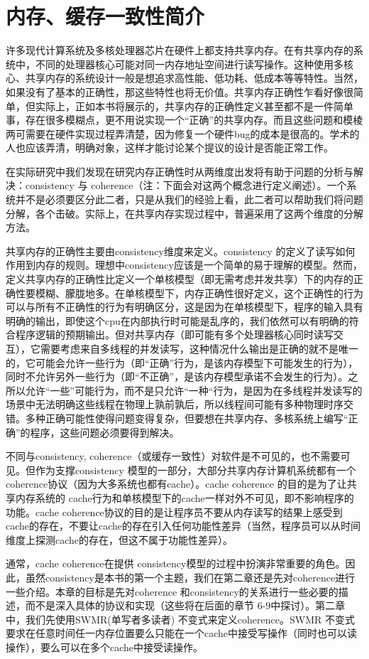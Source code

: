 \documentclass[UTF-8]{ctexbook}
\begin{document}
\chapter{内存、缓存一致性简介}
许多现代计算系统及多核处理器芯片在硬件上都支持共享内存。在有共享内存的系统中，不同的处理器核心可能对同一内存地址空间进行读写操作。这种使用多核心、共享内存的系统设计一般是想追求高性能、低功耗、低成本等等特性。当然，如果没有了基本的正确性，那这些特性也将无价值。共享内存正确性乍看好像很简单，但实际上，正如本书将展示的，共享内存的正确性定义甚至都不是一件简单事，存在很多模糊点，更不用说实现一个“正确”的共享内存。而且这些问题和模棱两可需要在硬件实现过程弄清楚，因为修复一个硬件bug的成本是很高的。学术的人也应该弄清，明确对象，这样才能讨论某个提议的设计是否能正常工作。
\par 在实际研究中我们发现在研究内存正确性时从两维度出发将有助于问题的分析与解决：consistency 与 coherence（注：下面会对这两个概念进行定义阐述）。一个系统并不是必须要区分此二者，只是从我们的经验上看，此二者可以帮助我们将问题分解，各个击破。实际上，在共享内存实现过程中，普遍采用了这两个维度的分解方法。
\par 共享内存的正确性主要由consistency维度来定义。consistency 的定义了读写如何作用到内存的规则。理想中consistency应该是一个简单的易于理解的模型。然而，定义共享内存的正确性比定义一个单核模型（即无需考虑并发共享）下的内存的正确性要模糊、朦胧地多。在单核模型下，内存正确性很好定义，这个正确性的行为可以与所有不正确性的行为有明确区分，这是因为在单核模型下，程序的输入具有明确的输出，即使这个cpu在内部执行时可能是乱序的，我们依然可以有明确的符合程序逻辑的预期输出。但对共享内存（即可能有多个处理器核心同时读写交互），它需要考虑来自多线程的并发读写，这种情况什么输出是正确的就不是唯一的，它可能会允许一些行为（即“正确”行为，是该内存模型下可能发生的行为），同时不允许另外一些行为（即“不正确”，是该内存模型承诺不会发生的行为）。之所以允许“一些”可能行为，而不是只允许“一种“行为，是因为在多线程并发读写的场景中无法明确这些线程在物理上孰前孰后，所以线程间可能有多种物理时序交错。多种正确可能性使得问题变得复杂，但要想在共享内存、多核系统上编写“正确”的程序，这些问题必须要得到解决。
\par 不同与consistency,  coherence（或缓存一致性）对软件是不可见的，也不需要可见。但作为支撑consistency 模型的一部分，大部分共享内存计算机系统都有一个coherence协议（因为大多系统也都有cache）。cache coherence 的目的是为了让共享内存系统的
cache行为和单核模型下的cache一样对外不可见，即不影响程序的功能。cache coherence协议的目的是让程序员不要从内存读写的结果上感受到cache的存在，不要让cache的存在引入任何功能性差异（当然，程序员可以从时间维度上探测cache的存在，但这不属于功能性差异）。
\par 通常，cache coherence在提供 consistency模型的过程中扮演非常重要的角色。因此，虽然consistency是本书的第一个主题，我们在第二章还是先对coherence进行一些介绍。本章的目标是先对coherence 和consistency的关系进行一些必要的描述，而不是深入具体的协议和实现（这些将在后面的章节 6-9中探讨）。第二章中，我们先使用SWMR(单写者多读者) 不变式来定义coherence。SWMR 不变式要求在任意时间任一内存位置要么只能在一个cache中接受写操作（同时也可以读操作），要么可以在多个cache中接受读操作。
\end{document}
